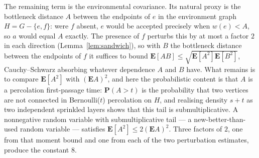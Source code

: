 \documentclass[10pt,a4paper]{amsart}
\newcommand{\E}{\mathbf{E}}
\newcommand{\PP}{\mathbf{P}}
\begin{document}
The remaining term is the environmental covariance. Its natural proxy is the
bottleneck distance $A$ between the endpoints of $e$ in the environment graph
$H=G-\{e,f\}$: were $f$ absent, $e$ would be accepted precisely when $w(e)<A$,
so $a$ would equal $A$ exactly. The presence of $f$ perturbs this by at most a
factor $2$ in each direction (Lemma~\ref{lem:sandwich}), so with $B$ the
bottleneck distance between the endpoints of $f$ it suffices to bound
$\E[AB]\le\sqrt{\E[A^2]\E[B^2]}$, Cauchy--Schwarz absorbing whatever dependence
$A$ and $B$ have. What remains is to compare $\E[A^2]$ with $(\E A)^2$, and here
the probabilistic content is that $A$ is a percolation first-passage time:
$\PP(A>t)$ is the probability that two vertices are not connected in
Bernoulli($t$) percolation on $H$, and realising density $s+t$ as two
independent sprinkled layers shows that this tail is submultiplicative. A
nonnegative random variable with submultiplicative tail --- a
new-better-than-used random variable --- satisfies $\E[A^2]\le2(\E A)^2$. Three factors of $2$, one
from that moment bound and one from each of the two perturbation estimates,
produce the constant $8$.
\end{document}
